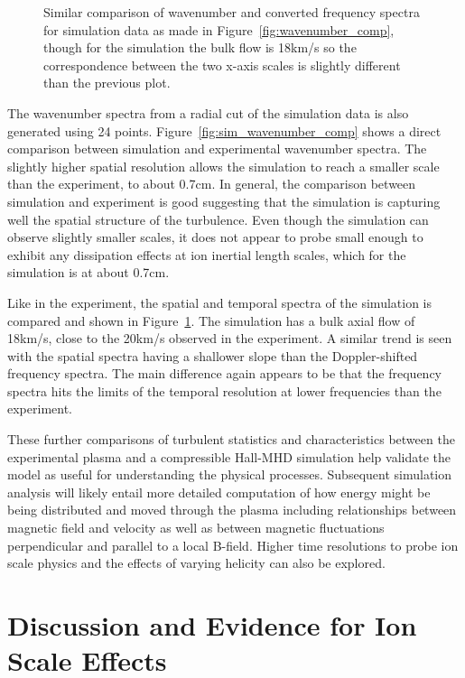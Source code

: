 \documentclass[manuscript]{aastex}
\begin{document}
\begin{figure}
\caption{\label{fig:sim_spatial_comp} Similar comparison of wavenumber and converted frequency spectra for simulation data as made in Figure~\ref{fig:wavenumber_comp}, though for the simulation the bulk flow is 18km/s so the correspondence between the two x-axis scales is slightly different than the previous plot.}
\end{figure}

The wavenumber spectra from a radial cut of the simulation data is also generated using 24 points. Figure~\ref{fig:sim_wavenumber_comp} shows a direct comparison between simulation and experimental wavenumber spectra. The slightly higher spatial resolution allows the simulation to reach a smaller scale than the experiment, to about 0.7cm. In general, the comparison between simulation and experiment is good suggesting that the simulation is capturing well the spatial structure of the turbulence. Even though the simulation can observe slightly smaller scales, it does not appear to probe small enough to exhibit any dissipation effects at ion inertial length scales, which for the simulation is at about 0.7cm.

Like in the experiment, the spatial and temporal spectra of the simulation is compared and shown in Figure~\ref{fig:sim_spatial_comp}. The simulation has a bulk axial flow of 18km/s, close to the 20km/s observed in the experiment. A similar trend is seen with the spatial spectra having a shallower slope than the Doppler-shifted frequency spectra. The main difference again appears to be that the frequency spectra hits the limits of the temporal resolution at lower frequencies than the experiment.

These further comparisons of turbulent statistics and characteristics between the experimental plasma and a compressible Hall-MHD simulation help validate the model as useful for understanding the physical processes. Subsequent simulation analysis will likely entail more detailed computation of how energy might be being distributed and moved through the plasma including relationships between magnetic field and velocity as well as between magnetic fluctuations perpendicular and parallel to a local B-field. Higher time resolutions to probe ion scale physics and the effects of varying helicity can also be explored.

\section{Discussion and Evidence for Ion Scale Effects}\label{sec:ionscale}
\end{document}
